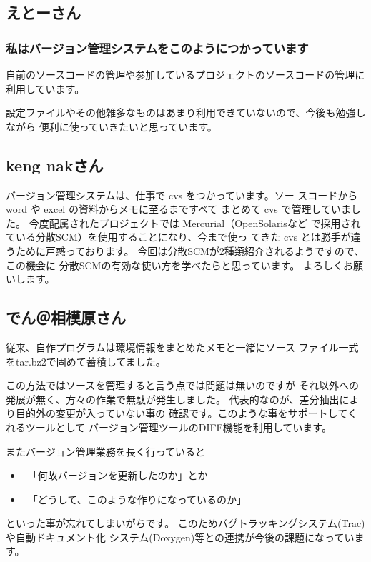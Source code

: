 \documentclass[mingoth,a4paper]{jsarticle}
\begin{document}
\subsection{えとーさん}

\subsubsection{私はバージョン管理システムをこのようにつかっています}


自前のソースコードの管理や参加しているプロジェクトのソースコードの管理に
利用しています。

設定ファイルやその他雑多なものはあまり利用できていないので、今後も勉強しながら
便利に使っていきたいと思っています。


\subsection{keng nakさん}

バージョン管理システムは、仕事で cvs をつかっています。ソー
スコードから word や excel の資料からメモに至るまですべて
まとめて cvs で管理していました。
今度配属されたプロジェクトでは Mercurial（OpenSolarisなど
で採用されている分散SCM）を使用することになり、今まで使っ
てきた cvs とは勝手が違うために戸惑っております。
今回は分散SCMが2種類紹介されるようですので、この機会に
分散SCMの有効な使い方を学べたらと思っています。
よろしくお願いします。


\subsection{でん＠相模原さん}

従来、自作プログラムは環境情報をまとめたメモと一緒にソース
ファイル一式をtar.bz2で固めて蓄積してました。

この方法ではソースを管理すると言う点では問題は無いのですが
それ以外への発展が無く、方々の作業で無駄が発生しました。
代表的なのが、差分抽出により目的外の変更が入っていない事の
確認です。このような事をサポートしてくれるツールとして
バージョン管理ツールのDIFF機能を利用しています。

またバージョン管理業務を長く行っていると
\begin{itemize}
 \item  　「何故バージョンを更新したのか」とか
 \item  　「どうして、このような作りになっているのか」
\end{itemize}
といった事が忘れてしまいがちです。
このためバグトラッキングシステム(Trac)や自動ドキュメント化
システム(Doxygen)等との連携が今後の課題になっています。
\end{document}
